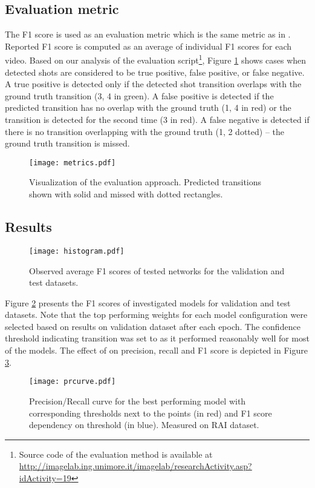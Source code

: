 \subsection{Evaluation metric}
\label{sec:eval_met}
The F1 score is used as an evaluation metric which is the same metric as in \cite{Baraldi15}. Reported F1 score is computed as an average of individual F1 scores for each video. Based on our analysis of the evaluation script\footnote{Source code of the evaluation method is available at \url{http://imagelab.ing.unimore.it/imagelab/researchActivity.asp?idActivity=19}}, Figure \ref{fig:metricVis} shows cases when detected shots are considered to be true positive, false positive, or false negative. A true positive is detected only if the detected shot transition overlaps with the ground truth transition (3, 4 in green). A false positive is detected if the predicted transition has no overlap with the ground truth (1, 4 in red) or the transition is detected for the second time (3 in red). A false negative is detected if there is no transition overlapping with the ground truth (1, 2 dotted) -- the ground truth transition is missed.


\begin{figure}[ht]
    \centering
    \texttt{[image: metrics.pdf]}
    \caption{Visualization of the evaluation approach. \textmd{Predicted transitions shown with solid and missed with dotted rectangles.}}
    \label{fig:metricVis}
\end{figure}

\subsection{Results}
\begin{figure}
    \centering
    \texttt{[image: histogram.pdf]}
    \caption{Observed average F1 scores of tested networks for the validation and test datasets.}
    \label{fig:F1scores}
\end{figure}

Figure \ref{fig:F1scores} presents the F1 scores of investigated models for validation and test datasets. Note that the top performing weights for each model configuration were selected based on results on validation dataset after each epoch. The confidence threshold  indicating transition was set to  as it performed reasonably well for most of the models. The effect of  on precision, recall and F1 score is depicted in Figure \ref{fig:prcurve}.

\begin{figure}
    \centering
    \texttt{[image: prcurve.pdf]}
    \caption{Precision/Recall curve for the best performing model with corresponding thresholds  next to the points (in red) and F1 score dependency on threshold (in blue). Measured on RAI dataset.}
    \label{fig:prcurve}
\end{figure}

